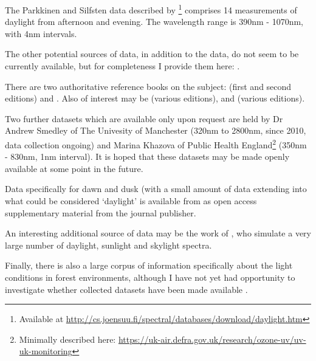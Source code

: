 The Parkkinen and Silfsten data described by \citet{kohonen_databases_2006}\footnote{Available at \url{http://cs.joensuu.fi/spectral/databases/download/daylight.htm}} comprises 14 measurements of daylight from afternoon and evening. The wavelength range is 390nm - 1070nm, with 4nm intervals.

The other potential sources of data, in addition to the \citet{judd_spectral_1964} data, do not seem to be currently available, but for completeness I provide them here: \citet{condit_spectral_1964, tarrant_spectral_1968, dicarlo_illuminant_2000, taylor_distribution_1941, henderson_spectral_1964, sastri_typical_1968, dixon_spectral_1978, sastri_spectral_1966,williams_statistical_2009,bui_group_2004}.

There are two authoritative reference books on the subject: \citet{henderson_daylight_1970,henderson_daylight_1977} (first and second editions) and \cite{robinson_solar_1966}. Also of interest may be \citet{minnaert_light_1993} (various editions), and \citet{lynch_color_2001} (various editions).

Two further datasets which are available only upon request are held by Dr Andrew Smedley of The Univesity of Manchester (320nm to 2800nm, since 2010, data collection ongoing) and Marina Khazova of Public Health England\footnote{Minimally described here: \url{https://uk-air.defra.gov.uk/research/ozone-uv/uv-uk-monitoring}} (350nm - 830nm, 1nm interval). It is hoped that these datasets may be made openly available at some point in the future.

Data specifically for dawn and dusk (with a small amount of data extending into what could be considered `daylight' is available from \citet{spitschan_variation_2016} as open access supplementary material from the journal publisher. 

An interesting additional source of data may be the work of \citet{peyvandi_colorimetric_2016}, who simulate a very large number of daylight, sunlight and skylight spectra. 

Finally, there is also a large corpus of information specifically about the light conditions in forest environments, although I have not yet had opportunity to investigate whether collected datasets have been made available \citep{sumner_catarrhine_2000,chiao_characterization_2000,federer_spectral_1966,geiger_climate_2003,thery_forest_2001,xu_changes_2013,wang_real-time_2006,endler_color_1993,brinkmann_light_1971,de_castro_light_2000,freyman_spectral_1968,fassnacht_review_2016,blackburn_seasonal_1995}.

